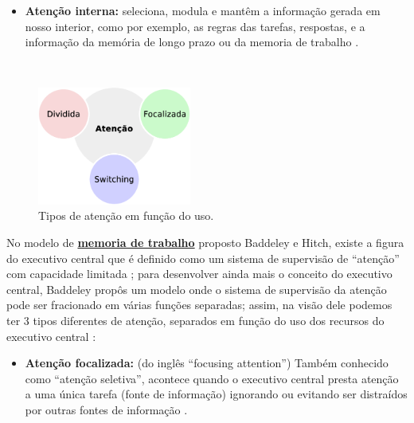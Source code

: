 \begin{itemize}
\item \textbf{Atenção interna:} 
seleciona, modula e mantêm a informação gerada em nosso interior,
como por exemplo, as regras das tarefas, respostas, e a informação da memória de longo prazo ou da memoria de trabalho 
\cite{ExternalInternalAttention} \cite[pp. 155]{eysenck2017manual}.
\end{itemize} ~

\begin{figure}
  \centering
    \includegraphics[width=0.45\textwidth]{chapters/cap-learning/attention3.eps}
\caption{Tipos de atenção em função do uso.}
\label{fig:attention3}
\end{figure}
No modelo de \hyperref[subsubsec:memoriatrabalho]{\textbf{memoria de trabalho}} 
proposto Baddeley e Hitch, 
existe a figura do executivo central que é definido como
um sistema de supervisão de ``atenção'' com capacidade limitada 
\cite[pp. 272, 281]{braisby2012cognitive};
para desenvolver ainda mais o conceito do executivo central,
Baddeley propôs um modelo onde o sistema de supervisão da atenção pode 
ser fracionado em várias funções separadas;
assim, na visão dele podemos ter 3 tipos diferentes de atenção, separados em função do uso
dos recursos \cite[pp. 282]{braisby2012cognitive} do executivo central \cite[pp. 127]{eysenck2017manual}:
\begin{itemize}
\item \textbf{Atenção focalizada:} (do inglês ``focusing attention'') 
Também conhecido como ``atenção seletiva'', 
acontece quando o executivo central presta atenção a uma única tarefa (fonte de informação) ignorando 
ou evitando ser distraídos por outras fontes de informação 
\cite[pp. 282]{braisby2012cognitive} \cite[pp. 155, 716]{eysenck2017manual}
\cite[pp. 127]{eysenck2017manual}.
\end{itemize}

